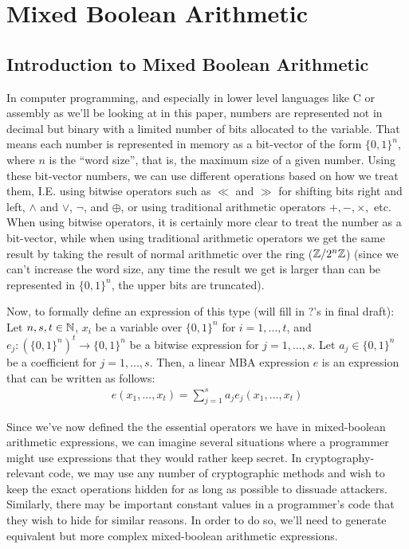 \section{Mixed Boolean Arithmetic}
\subsection{Introduction to Mixed Boolean Arithmetic}
In computer programming, and especially in lower level languages like C or 
assembly as we'll be looking at in this paper, numbers are represented
not in decimal but binary with a limited number of bits allocated to the 
variable. That means each number is represented in memory as a bit-vector of
the form $\{0,1\}^n$, where $n$ is the ``word size'', that is, the maximum 
size of a given number. Using these bit-vector numbers, we can use different
operations based on how we treat them, I.E. using bitwise operators such as
$\ll$ and $\gg$ for shifting bits right and left, $\land$ and $\lor$, $\neg$, 
and $\oplus$, or using traditional arithmetic operators $+, -, \times,$ etc.
When using bitwise operators, it is certainly more clear to treat the 
number as a bit-vector, while when using traditional arithmetic operators
we get the same result by taking the result of normal arithmetic over the ring 
($\mathbb{Z}/2^n\mathbb{Z}$) (since we can't increase the word size, any time the result we
get is larger than can be represented in $\{0,1\}^n$, the upper bits are truncated).
\par Now, to formally define an expression of this type (will fill in ?'s in final draft):
 {Let $n,s,t \in \mathbb{N}$, $x_i$ be a variable over $\{0,1\}^n$ for
$i = 1,...,t$, and $e_j : (\{0,1\}^n)^t \rightarrow \{0,1\}^n$ be a bitwise expression for
$j = 1,...,s$. Let $a_j\in \{0,1\}^n$ be a coefficient for $j = 1,...,s$.
Then, a linear MBA expression $e$ is an expression that can be written as follows:
\begin{align*}
    e(x_1, ..., x_t) = \sum_{j=1}^s a_j e_j(x_1,...,x_t)
\end{align*}
}
\par Since we've now defined the the essential operators we have in mixed-boolean arithmetic
expressions, we can imagine several situations where a programmer might use expressions 
that they would rather keep secret. In cryptography-relevant code, we may use any
number of cryptographic methods and wish to keep the exact operations hidden 
for as long as possible to dissuade attackers. Similarly, there may be important
constant values in a programmer's code that they wish to hide for similar reasons.
In order to do so, we'll need to generate equivalent but more complex mixed-boolean
arithmetic expressions.
